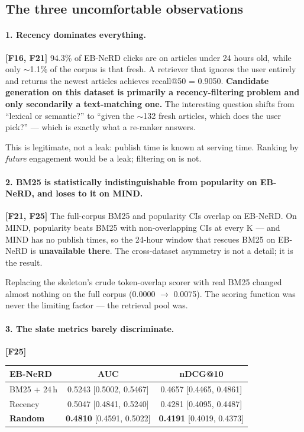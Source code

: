 \documentclass[11pt,a4paper]{article}
\newcommand{\brk}[1]{%
  \begingroup\ttfamily\hyphenchar\font=-1
  \discretionary{}{}{}%
  \expandafter\brkscan\detokenize{#1}\relax\endgroup}
\def\brkscan#1{%
  \ifx#1\relax\else
    \char`#1%
    \ifnum`#1=`/ \penalty0 \fi
    \ifnum`#1=`_ \penalty0 \fi
    \ifnum`#1=`. \penalty0 \fi
    \expandafter\brkscan
  \fi}
\newcommand{\finding}[1]{\textcolor{blue!55!black}{\textbf{[#1]}}}
\begin{document}
\subsection{The three uncomfortable observations}\label{sec:obs}

\paragraph{1. Recency dominates everything.} \finding{F16, F21}
94.3\% of EB-NeRD clicks are on articles under 24 hours old, while only $\sim$1.1\% of the corpus
is that fresh. A retriever that ignores the user entirely and returns the newest articles achieves
recall@50 = 0.9050. \textbf{Candidate generation on this dataset is primarily a
recency-filtering problem and only secondarily a text-matching one.} The interesting question
shifts from ``lexical or semantic?'' to ``given the $\sim$132 fresh articles, which does the user
pick?'' --- which is exactly what a re-ranker answers.

This is legitimate, not a leak: publish time is known at serving time. Ranking by \emph{future}
engagement would be a leak; filtering on \brk{published_time < t} is not.

\paragraph{2. BM25 is statistically indistinguishable from popularity on EB-NeRD, and loses to it
on MIND.} \finding{F21, F25}
The full-corpus BM25 and popularity CIs overlap on EB-NeRD. On MIND, popularity beats BM25 with
non-overlapping CIs at every K --- and MIND has no publish times, so the 24-hour window that
rescues BM25 on EB-NeRD is \textbf{unavailable there}. The cross-dataset asymmetry is not a
detail; it is the result.

Replacing the skeleton's crude token-overlap scorer with real BM25 changed almost nothing on the
full corpus (0.0000 $\rightarrow$ 0.0075). The scoring function was never the limiting factor ---
the retrieval pool was.

\paragraph{3. The slate metrics barely discriminate.} \finding{F25}

\begin{center}\small
\begin{tabular}{lcc}
\toprule
EB-NeRD & AUC & nDCG@10 \\
\midrule
BM25 + 24\,h & 0.5243 [0.5002, 0.5467] & 0.4657 [0.4465, 0.4861] \\
Recency      & 0.5047 [0.4841, 0.5240] & 0.4281 [0.4095, 0.4487] \\
\textbf{Random} & \textbf{0.4810} [0.4591, 0.5022] & \textbf{0.4191} [0.4019, 0.4373] \\
\bottomrule
\end{tabular}
\end{center}
\end{document}
